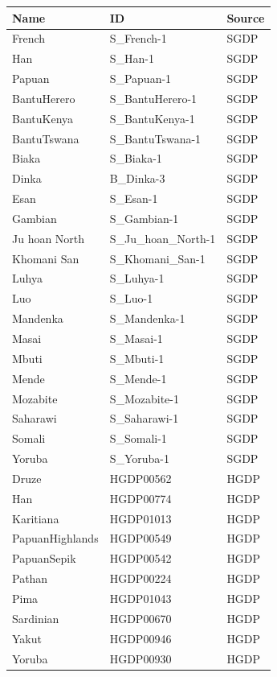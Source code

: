 \documentclass{article}
\begin{document}
\begin{table}[ht]
\centering
\begin{tabular}{lll}
  \hline
Name & ID & Source \\ 
  \hline
French & S\_French-1 & SGDP \\ 
  Han & S\_Han-1 & SGDP \\ 
  Papuan & S\_Papuan-1 & SGDP \\ 
  BantuHerero & S\_BantuHerero-1 & SGDP \\ 
  BantuKenya & S\_BantuKenya-1 & SGDP \\ 
  BantuTswana & S\_BantuTswana-1 & SGDP \\ 
  Biaka & S\_Biaka-1 & SGDP \\ 
  Dinka & B\_Dinka-3 & SGDP \\ 
  Esan & S\_Esan-1 & SGDP \\ 
  Gambian & S\_Gambian-1 & SGDP \\ 
  Ju hoan North & S\_Ju\_hoan\_North-1 & SGDP \\ 
  Khomani San & S\_Khomani\_San-1 & SGDP \\ 
  Luhya & S\_Luhya-1 & SGDP \\ 
  Luo & S\_Luo-1 & SGDP \\ 
  Mandenka & S\_Mandenka-1 & SGDP \\ 
  Masai & S\_Masai-1 & SGDP \\ 
  Mbuti & S\_Mbuti-1 & SGDP \\ 
  Mende & S\_Mende-1 & SGDP \\ 
  Mozabite & S\_Mozabite-1 & SGDP \\ 
  Saharawi & S\_Saharawi-1 & SGDP \\ 
  Somali & S\_Somali-1 & SGDP \\ 
  Yoruba & S\_Yoruba-1 & SGDP \\ 
  Druze & HGDP00562 & HGDP \\ 
  Han & HGDP00774 & HGDP \\ 
  Karitiana & HGDP01013 & HGDP \\ 
  PapuanHighlands & HGDP00549 & HGDP \\ 
  PapuanSepik & HGDP00542 & HGDP \\ 
  Pathan & HGDP00224 & HGDP \\ 
  Pima & HGDP01043 & HGDP \\ 
  Sardinian & HGDP00670 & HGDP \\ 
  Yakut & HGDP00946 & HGDP \\ 
  Yoruba & HGDP00930 & HGDP \\ 

\end{tabular}
\end{table}
\end{document}

